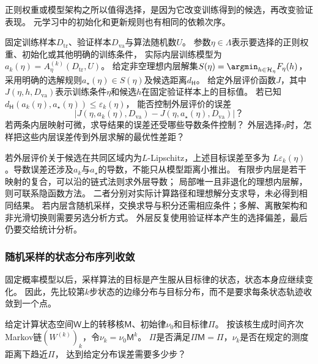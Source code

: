 正则权重或模型架构之所以值得选择，是因为它改变训练得到的候选，再改变验证表现。
元学习中的初始化和更新规则也有相同的依赖次序。

\begin{mathproblem}[内层求解误差对外层目标与导数的影响]
  \label{question:future-nested-learning}
  固定训练样本$D_{\mathrm{tr}}$、验证样本$D_{\mathrm{va}}$与算法随机数$U$。
  参数$\eta\in\Lambda$表示要选择的正则权重、初始化或其他明确的训练条件，
  实际内层训练模型为$a_k(\eta)=A_\eta^{(k)}(D_{\mathrm{tr}},U)$。
  给定非空理想内层解集$S(\eta)=\argmin_{h\in\mathcal H_\eta}F_\eta(h)$，
  采用明确的选解规则$a_\star(\eta)\in S(\eta)$及候选距离$d_{\mathsf H}$。
  给定外层评价函数$J$，其中$J(\eta,h,D_{\mathrm{va}})$表示训练条件$\eta$和候选$h$在固定验证样本上的目标值。
  若已知$d_{\mathsf H}(a_k(\eta),a_\star(\eta))\leq\varepsilon_k(\eta)$，
  能否控制外层评价的误差
  \[
    \left|J(\eta,a_k(\eta),D_{\mathrm{va}})
          -J(\eta,a_\star(\eta),D_{\mathrm{va}})\right|\text{？}
  \]
  若两条内层映射可微，求导结果的误差还受哪些导数条件控制？
  外层选择$\eta$时，怎样把这些内层误差传到外层求解的最优性差距？
\end{mathproblem}

若外层评价关于候选在共同区域内为$L$-Lipschitz，上述目标误差至多为
$L\varepsilon_k(\eta)$。导数误差还涉及$a_k$与$a_\star$的导数，不能只从模型距离小推出。
有限步内层是若干映射的复合，可以沿的链式法则求外层导数；
局部唯一且非退化的理想内层解，则可联系隐函数方法。
二者分别对实际计算路径和理想解分支求导，未必得到相同结果。
若内层含随机采样，交换求导与积分还需相应条件；多解、离散架构和非光滑切换则需要另选分析方式。
外层反复使用验证样本产生的选择偏差，最后仍要交给统计分析。

\subsubsection{随机采样的状态分布序列收敛}
\label{sec:future-analysis-sampling-dynamics}

固定概率模型以后，采样算法的目标是产生服从目标律的状态，状态本身应继续变化。
因此，先比较第$k$步状态的边缘分布与目标分布，而不是要求每条状态轨迹收敛到一个点。

\begin{mathproblem}[采样状态分布是否趋近目标分布]
  \label{question:future-sampling-dynamics}
  给定计算状态空间$\mathsf W$上的转移核$\mathsf M$、初始律$\nu_0$和目标律$\Pi$。
  按该核生成时间齐次Markov链$(W^{(k)})_k$，令$\nu_k=\nu_0\mathsf M^k$。
  $\Pi$是否满足$\Pi\mathsf M=\Pi$，$\nu_k$是否在规定的测度距离下趋近$\Pi$，
  达到给定分布误差需要多少步？
\end{mathproblem}

